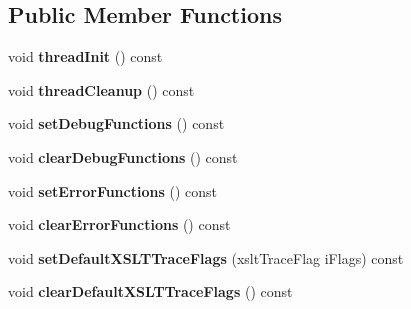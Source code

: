 \subsection*{\-Public \-Member \-Functions}
\begin{DoxyCompactItemize}
\item 
\hypertarget{classgeneral__server_1_1LibXmlLibrary_aa02c155c9b1133ab31ab1ece408af461}{void {\bfseries thread\-Init} () const }\label{classgeneral__server_1_1LibXmlLibrary_aa02c155c9b1133ab31ab1ece408af461}

\item 
\hypertarget{classgeneral__server_1_1LibXmlLibrary_adbff7a050d514a36c53c3cf5195282d6}{void {\bfseries thread\-Cleanup} () const }\label{classgeneral__server_1_1LibXmlLibrary_adbff7a050d514a36c53c3cf5195282d6}

\item 
\hypertarget{classgeneral__server_1_1LibXmlLibrary_afc96bc984b63b85bf0287d8078750341}{void {\bfseries set\-Debug\-Functions} () const }\label{classgeneral__server_1_1LibXmlLibrary_afc96bc984b63b85bf0287d8078750341}

\item 
\hypertarget{classgeneral__server_1_1LibXmlLibrary_af0ada0ba7acff58f8698c7a1a833d938}{void {\bfseries clear\-Debug\-Functions} () const }\label{classgeneral__server_1_1LibXmlLibrary_af0ada0ba7acff58f8698c7a1a833d938}

\item 
\hypertarget{classgeneral__server_1_1LibXmlLibrary_ab7b79b9b31b01497a587ecb43c0c84e6}{void {\bfseries set\-Error\-Functions} () const }\label{classgeneral__server_1_1LibXmlLibrary_ab7b79b9b31b01497a587ecb43c0c84e6}

\item 
\hypertarget{classgeneral__server_1_1LibXmlLibrary_ac839aa04bf83707fe95f362bfd7f656f}{void {\bfseries clear\-Error\-Functions} () const }\label{classgeneral__server_1_1LibXmlLibrary_ac839aa04bf83707fe95f362bfd7f656f}

\item 
\hypertarget{classgeneral__server_1_1LibXmlLibrary_ad47404ef8542682024073b6da858cf20}{void {\bfseries set\-Default\-X\-S\-L\-T\-Trace\-Flags} (xslt\-Trace\-Flag i\-Flags) const }\label{classgeneral__server_1_1LibXmlLibrary_ad47404ef8542682024073b6da858cf20}

\item 
\hypertarget{classgeneral__server_1_1LibXmlLibrary_ae6aa8d68e547c355810506ce3093f74e}{void {\bfseries clear\-Default\-X\-S\-L\-T\-Trace\-Flags} () const }\label{classgeneral__server_1_1LibXmlLibrary_ae6aa8d68e547c355810506ce3093f74e}


\end{DoxyCompactItemize}

